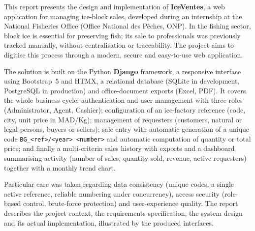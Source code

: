 This report presents the design and implementation of \textbf{IceVentes}, a web application for managing ice-block sales, developed during an internship at the National Fisheries Office (Office National des Pêches, ONP). In the fishing sector, block ice is essential for preserving fish; its sale to professionals was previously tracked manually, without centralisation or traceability. The project aims to digitise this process through a modern, secure and easy-to-use web application.

The solution is built on the Python \textbf{Django} framework, a responsive interface using Bootstrap~5 and HTMX, a relational database (SQLite in development, PostgreSQL in production) and office-document exports (Excel, PDF). It covers the whole business cycle: authentication and user management with three roles (Administrator, Agent, Cashier); configuration of an ice-factory reference (code, city, unit price in MAD/Kg); management of requesters (customers, natural or legal persons, buyers or sellers); sale entry with automatic generation of a unique code \texttt{BG\_<ref>/<year> <number>} and automatic computation of quantity or total price; and finally a multi-criteria sales history with exports and a dashboard summarising activity (number of sales, quantity sold, revenue, active requesters) together with a monthly trend chart.

Particular care was taken regarding data consistency (unique codes, a single active reference, reliable numbering under concurrency), access security (role-based control, brute-force protection) and user-experience quality. The report describes the project context, the requirements specification, the system design and its actual implementation, illustrated by the produced interfaces.
